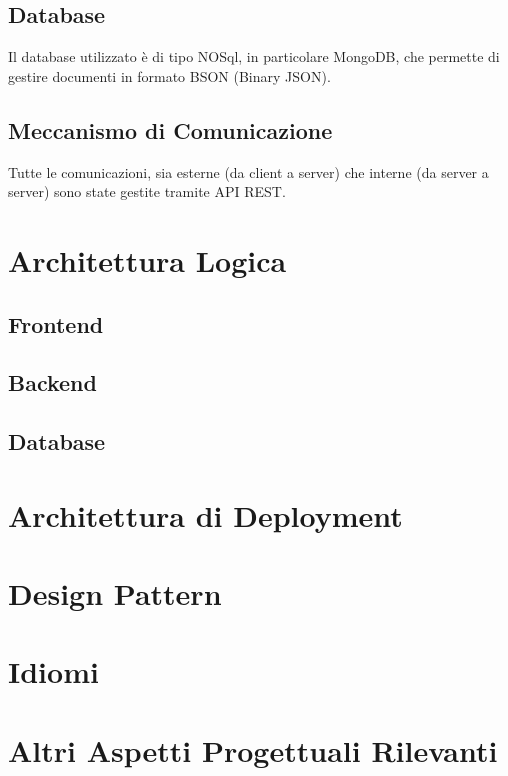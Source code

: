 \documentclass[a4paper, 11pt]{article}
\begin{document}
\subsection{Database}
Il database utilizzato è di tipo NOSql, in particolare MongoDB, che permette di gestire documenti in formato BSON (Binary JSON).\\

\subsection{Meccanismo di Comunicazione}
Tutte le comunicazioni, sia esterne (da client a server) che interne (da server a server) sono state gestite tramite API REST.\\

\newpage
\section{Architettura Logica}
\subsection{Frontend}
\subsection{Backend}
\subsection{Database}
\newpage
\section{Architettura di Deployment}

\newpage
\section{Design Pattern}

\newpage
\section{Idiomi}

\newpage
\section{Altri Aspetti Progettuali Rilevanti}
\end{document}

